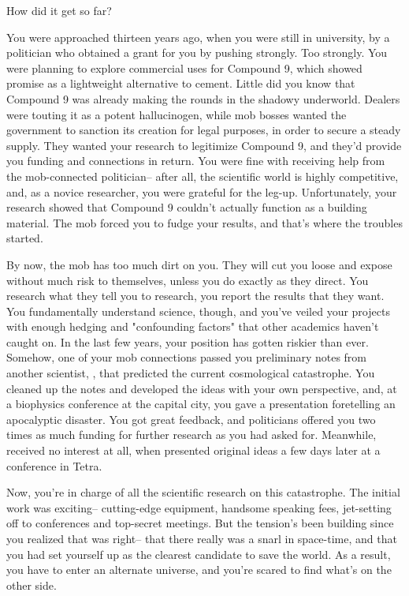 \documentclass[char]{guildcamp3}
\begin{document}
\name{\cSciOne{}}

How did it get so far?

You were approached thirteen years ago, when you were still in university, by a politician who obtained a grant for you by pushing strongly. Too strongly. You were planning to explore commercial uses for Compound 9, which showed promise as a lightweight alternative to cement. Little did you know that Compound 9 was already making the rounds in the shadowy underworld. Dealers were touting it as a potent hallucinogen, while mob bosses wanted the government to sanction its creation for legal purposes, in order to secure a steady supply. They wanted your research to legitimize Compound 9, and they'd provide you funding and connections in return. You were fine with receiving help from the mob-connected politician-- after all, the scientific world is highly competitive, and, as a novice researcher, you were grateful for the leg-up. Unfortunately, your research showed that Compound 9 couldn't actually function as a building material. The mob forced you to fudge your results, and that's where the troubles started.

By now, the mob has too much dirt on you. They will cut you loose and expose without much risk to themselves, unless you do exactly as they direct. You research what they tell you to research, you report the results that they want. You fundamentally understand science, though, and you've veiled your projects with enough hedging and "confounding factors" that other academics haven't caught on. In the last few years, your position has gotten riskier than ever. Somehow, one of your mob connections passed you preliminary notes from another scientist, \cSciTwo{}, that predicted the current cosmological catastrophe. You cleaned up the notes and developed the ideas with your own perspective, and, at a biophysics conference at the capital city, you gave a presentation foretelling an apocalyptic disaster. You got great feedback, and politicians offered you two times as much funding for further research as you had asked for. Meanwhile, \cSciTwo{} received no interest at all, when \cSciTwo{\they} presented \cSciTwo{\their} original ideas a few days later at a conference in Tetra.

Now, you're in charge of all the scientific research on this catastrophe. The initial work was exciting-- cutting-edge equipment, handsome speaking fees, jet-setting off to conferences and top-secret meetings. But the tension's been building since you realized that \cSciTwo{} was right-- that there really was a snarl in space-time, and that you had set yourself up as the clearest candidate to save the world. As a result, you have to enter an alternate universe, and you're scared to find what's on the other side.
\end{document}
